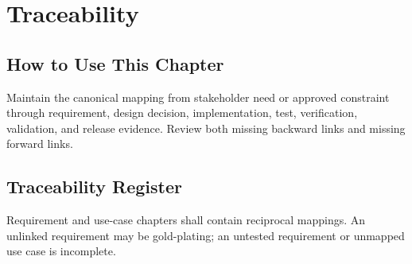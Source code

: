\chapter{Traceability}
\section{How to Use This Chapter}
Maintain the canonical mapping from stakeholder need or approved constraint through requirement, design decision, implementation, test, verification, validation, and release evidence. Review both missing backward links and missing forward links.
\section{Traceability Register}
Requirement and use-case chapters shall contain reciprocal mappings. An
unlinked requirement may be gold-plating; an untested requirement or unmapped
use case is incomplete.

